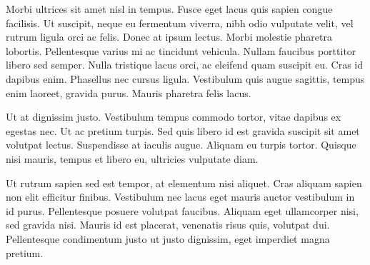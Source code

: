 Morbi ultrices sit amet nisl in tempus. Fusce eget lacus quis sapien congue facilisis. Ut suscipit, neque eu fermentum viverra, nibh odio vulputate velit, vel rutrum ligula orci ac felis. Donec at ipsum lectus. Morbi molestie pharetra lobortis. Pellentesque varius mi ac tincidunt vehicula. Nullam faucibus porttitor libero sed semper. Nulla tristique lacus orci, ac eleifend quam suscipit eu. Cras id dapibus enim. Phasellus nec cursus ligula. Vestibulum quis augue sagittis, tempus enim laoreet, gravida purus. Mauris pharetra felis lacus.

Ut at dignissim justo. Vestibulum tempus commodo tortor, vitae dapibus ex egestas nec. Ut ac pretium turpis. Sed quis libero id est gravida suscipit sit amet volutpat lectus. Suspendisse at iaculis augue. Aliquam eu turpis tortor. Quisque nisi mauris, tempus et libero eu, ultricies vulputate diam.

Ut rutrum sapien sed est tempor, at elementum nisi aliquet. Cras aliquam sapien non elit efficitur finibus. Vestibulum nec lacus eget mauris auctor vestibulum in id purus. Pellentesque posuere volutpat faucibus. Aliquam eget ullamcorper nisi, sed gravida nisi. Mauris id est placerat, venenatis risus quis, volutpat dui. Pellentesque condimentum justo ut justo dignissim, eget imperdiet magna pretium.